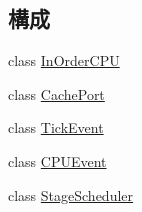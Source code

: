 \subsection*{構成}
\begin{DoxyCompactItemize}
\item 
class \hyperlink{classInOrderCPU}{InOrderCPU}
\item 
class \hyperlink{classInOrderCPU_1_1CachePort}{CachePort}
\item 
class \hyperlink{classInOrderCPU_1_1TickEvent}{TickEvent}
\item 
class \hyperlink{classInOrderCPU_1_1CPUEvent}{CPUEvent}
\item 
class \hyperlink{classInOrderCPU_1_1StageScheduler}{StageScheduler}
\end{DoxyCompactItemize}
